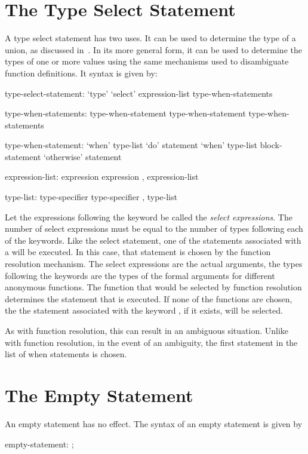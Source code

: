 \section{The Type Select Statement}
\label{The_Type_Select_Statement}


A type select statement has two uses.  It can be used to determine the
type of a union, as discussed
in~.  In its more general
form, it can be used to determine the types of one or more values
using the same mechanisms used to disambiguate function definitions.
It syntax is given by:
\begin{syntax}
type-select-statement:
  `type' `select' expression-list { type-when-statements }

type-when-statements:
  type-when-statement
  type-when-statement type-when-statements

type-when-statement:
  `when' type-list `do' statement
  `when' type-list block-statement
  `otherwise' statement

expression-list:
  expression
  expression , expression-list

type-list:
  type-specifier
  type-specifier , type-list
\end{syntax}

Let the expressions following the keyword  be called the 
\emph{select expressions}.  The number of select expressions must be equal to the
number of types following each of the  keywords.  Like the
select statement, one of the statements associated with a 
will be executed.  In this case, that statement is chosen by the
function resolution mechanism.  The select expressions are the actual
arguments, the types following the  keywords are the types
of the formal arguments for different anonymous functions.  The
function that would be selected by function resolution determines the
statement that is executed.  If none of the functions are chosen, the
the statement associated with the keyword , if it
exists, will be selected.

As with function resolution, this can result in an ambiguous
situation.  Unlike with function resolution, in the event of an
ambiguity, the first statement in the list of when statements is
chosen.

\section{The Empty Statement}
\label{The_Empty_Statement}

An empty statement has no effect.  The syntax of an empty statement is
given by
\begin{syntax}
empty-statement:
  ;
\end{syntax}
